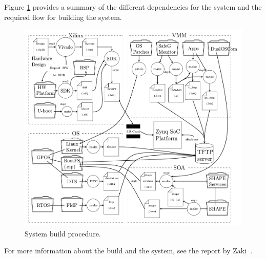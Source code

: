 
Figure \ref{fig:system_build} provides a summary of the different dependencies for the system and the required flow for building the system.

\begin{figure}[H]
\centering
\includegraphics[width=\textwidth]{./img/literature_build.png}
\caption{System build procedure.\cite{zaki2016}}\label{fig:system_build}
\end{figure}

For more information about the build and the system, see the report by Zaki~\cite{zaki2016}.